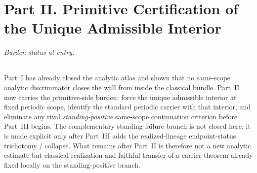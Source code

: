\part*{Part II. Primitive Certification of the Unique Admissible Interior}

\paragraph{Burden status at entry.}
Part~I has already closed the analytic atlas and shown that no same-scope analytic discriminator closes the wall from inside the classical bundle. Part~II now carries the primitive-side burden: force the unique admissible interior at fixed periodic scope, identify the standard periodic carrier with that interior, and eliminate any rival \emph{standing-positive} same-scope continuation criterion before Part~III begins. The complementary standing-failure branch is not closed here; it is made explicit only after Part~III adds the realized-lineage endpoint-status trichotomy / collapse. What remains after Part~II is therefore not a new analytic estimate but classical realization and faithful transfer of a carrier theorem already fixed locally on the standing-positive branch.

